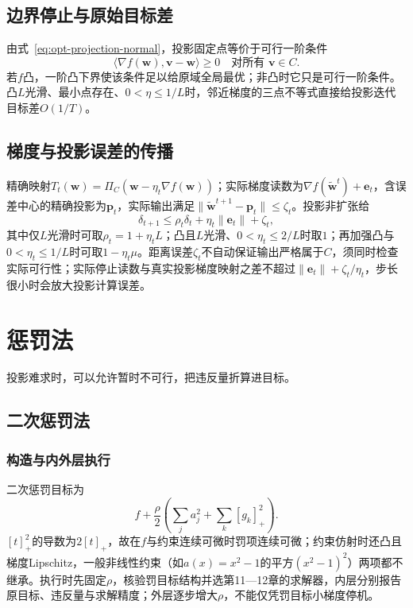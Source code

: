 \subsection{边界停止与原始目标差}

由式~\eqref{eq:opt-projection-normal}，投影固定点等价于可行一阶条件
\[
 \langle\nabla f(\bm w),\bm v-\bm w\rangle\geq0
 \quad\text{对所有 }\bm v\in C.
\]
若$f$凸，一阶凸下界使该条件足以给原域全局最优；非凸时它只是可行一阶条件。凸$L$光滑、最小点存在、$0<\eta\leq1/L$时，邻近梯度的三点不等式直接给投影迭代目标差$O(1/T)$。

\subsection{梯度与投影误差的传播}

精确映射$T_t(\bm w)=\Pi_C(\bm w-\eta_t\nabla f(\bm w))$；实际梯度读数为$\nabla f(\widetilde{\bm w}^t)+\bm e_t$，含误差中心的精确投影为$\bm p_t$，实际输出满足$\|\widetilde{\bm w}^{t+1}-\bm p_t\|\leq\zeta_t$。投影非扩张给
\[
 \delta_{t+1}\leq\rho_t\delta_t+\eta_t\|\bm e_t\|+\zeta_t,
\]
其中仅$L$光滑时可取$\rho_t=1+\eta_t L$；凸且$L$光滑、$0<\eta_t\leq2/L$时取$1$；再加强凸与$0<\eta_t\leq1/L$时可取$1-\eta_t\mu$。距离误差$\zeta_t$不自动保证输出严格属于$C$，须同时检查实际可行性；实际停止读数与真实投影梯度映射之差不超过$\|\bm e_t\|+\zeta_t/\eta_t$，步长很小时会放大投影计算误差。

\section{惩罚法}

投影难求时，可以允许暂时不可行，把违反量折算进目标。

\subsection{二次惩罚法}

\subsubsection{构造与内外层执行}

二次惩罚目标为
\[
 f+\frac{\rho}{2}\left(\sum_j a_j^2+\sum_k[g_k]_+^2\right).
\]
$[t]_+^2$的导数为$2[t]_+$，故在$f$与约束连续可微时罚项连续可微；约束仿射时还凸且梯度Lipschitz，一般非线性约束（如$a(x)=x^2-1$的平方$(x^2-1)^2$）两项都不继承。执行时先固定$\rho$，核验罚目标结构并选第11—12章的求解器，内层分别报告原目标、违反量与求解精度；外层逐步增大$\rho$，不能仅凭罚目标小梯度停机。

